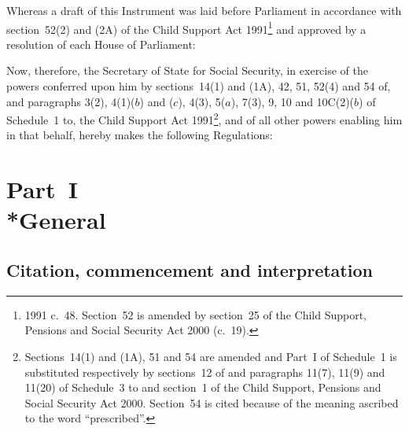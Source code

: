 \documentclass[12pt,a4paper]{article}
\title{\regstitle}
\author{S.I. 2001 No. 155}
\date{Made 18th January 2001\\
Coming into force in accordance with regulation~1(4) and (5)
}
\begin{document}
\maketitle


\medskip

\noindent
Whereas a draft of this Instrument was laid before Parliament in accordance with section~52(2) and (2A) of the Child Support Act 1991\footnote{1991 c.\ 48. Section~52 is amended by section~25 of the Child Support, Pensions and Social Security Act 2000 (c.\ 19).} and approved by a resolution of each House of Parliament:

Now, therefore, the Secretary of State for Social Security, in exercise of the powers conferred upon him by sections~14(1) and (1A), 42, 51, 52(4) and 54 of, and paragraphs 3(2), 4(1)($b$)  and ($c$), 4(3), 5($a$), 7(3), 9, 10 and 10C(2)($b$)  of Schedule~1 to, the Child Support Act 1991\footnote{Sections~14(1) and (1A), 51 and 54 are amended and Part~I of Schedule~1 is substituted respectively by sections~12 of and paragraphs 11(7), 11(9) and 11(20) of Schedule~3 to and section~1 of the Child Support, Pensions and Social Security Act 2000. Section~54 is cited because of the meaning ascribed to the word “prescribed”.}, and of all other powers enabling him in that behalf, hereby makes the following Regulations: 

\enlargethispage{\baselineskip}

{\sloppy

\tableofcontents

}

\bigskip

\setcounter{secnumdepth}{-2}

\section[Part~I --- General]{Part~I\\*General}

\renewcommand\parthead{--- Part~I}

\subsection[1. Citation, commencement and interpretation]{Citation, commencement and interpretation}
\end{document}
